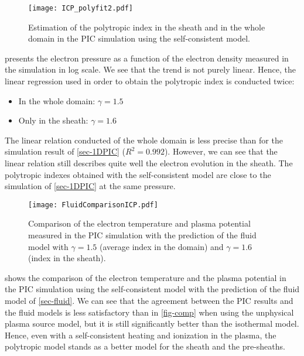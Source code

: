   \begin{figure}[!htbp]
    \centering
    \texttt{[image: ICP\_polyfit2.pdf]}
    \caption{Estimation of the polytropic index in the sheath and in the whole domain in the PIC simulation using the self-consistent model.}
    \label{fig-icpfit}
  \end{figure}

   presents the electron pressure as a function of the electron density measured in the simulation in log scale.
  We see that the trend is not purely linear. Hence, the linear regression used in order to obtain the polytropic index is conducted twice\string:
  \begin{itemize}
    \item In the whole domain\string: $\gamma=1.5$
    \item Only in the sheath\string: $\gamma=1.6$
  \end{itemize}
  The linear relation conducted of the whole domain is less precise than for the simulation result of \cref{sec-1DPIC} ($R^2=0.992$).
  However, we can see that the linear relation still describes quite well the electron evolution in the sheath.
  The polytropic indexes obtained with the self-consistent model are close to the simulation of \cref{sec-1DPIC} at the same pressure.

  \begin{figure}[!htbp]
    \centering
    \texttt{[image: FluidComparisonICP.pdf]}
    \caption{Comparison of the electron temperature and plasma potential measured in the PIC simulation with the prediction of the fluid model with $\gamma = 1.5$ (average index in the domain) and $\gamma=1.6$ (index in the sheath).}
    \label{fig-comp2}
  \end{figure}

   shows the comparison of the electron temperature and the plasma potential in the PIC simulation using the self-consistent model with the prediction of the fluid model of \cref{sec-fluid}.
  We can see that the agreement between the PIC results and the fluid models is less satisfactory than in \cref{fig-comp} when using the unphysical plasma source model, but it is still significantly better than the isothermal model.
  Hence, even with a self-consistent heating and ionization in the plasma, the polytropic model stands as a better model for the sheath and the pre-sheaths.
